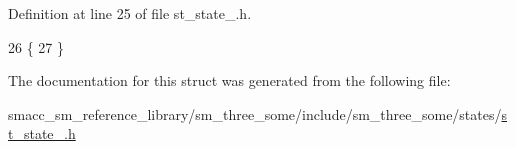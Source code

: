 Definition at line 25 of file st\+\_\+state\+\_.\+h.


\begin{DoxyCode}
26     \{
27     \}
\end{DoxyCode}


The documentation for this struct was generated from the following file\+:\begin{DoxyCompactItemize}
\item 
smacc\+\_\+sm\+\_\+reference\+\_\+library/sm\+\_\+three\+\_\+some/include/sm\+\_\+three\+\_\+some/states/\hyperlink{sm__three__some_2include_2sm__three__some_2states_2st__state__2_8h}{st\+\_\+state\+\_.\+h}\end{DoxyCompactItemize}
